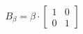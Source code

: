 \documentclass[preview]{standalone}
\begin{document}
\begin{align*}
B_{\beta} = \beta \cdot \begin{bmatrix} 1 & 0 \\ 0 & 1 \end{bmatrix}
\end{align*}
\end{document}
